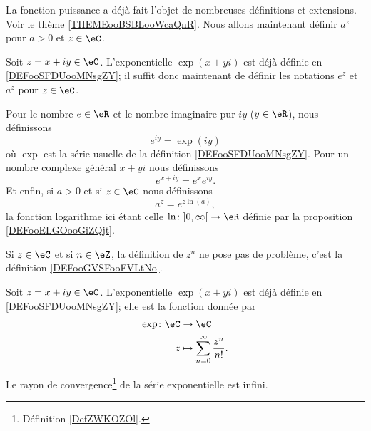 La fonction puissance a déjà fait l'objet de nombreuses définitions et extensions. Voir le thème \ref{THEMEooBSBLooWcaQnR}. Nous allons maintenant définir \( a^z\) pour \( a>0\) et \( z\in \eC\).


Soit \( z=x+iy\in \eC\). L'exponentielle \( \exp(x+yi)\) est déjà définie en \ref{DEFooSFDUooMNsgZY}; il suffit donc maintenant de définir les notations \(  e^{z}\) et \( a^z\) pour \( z\in \eC\).

\begin{definition}      \label{DEFooRBTDooNLcWGj}
	Pour le nombre \( e\in \eR\) et le nombre imaginaire pur \( iy\) (\( y\in \eR\)), nous définissons
	\begin{equation}
		e^{iy}=\exp(iy)
	\end{equation}
	où \( \exp\) est la série usuelle de la définition \ref{DEFooSFDUooMNsgZY}. Pour un nombre complexe général \( x+yi\) nous définissons
	\begin{equation}
		e^{x+iy}= e^{x} e^{iy}.
	\end{equation}
	Et enfin, si \( a>0\) et si \( z\in \eC\) nous définissons
	\begin{equation}
		a^z= e^{z\ln(a)},
	\end{equation}
	la fonction logarithme ici étant celle \( \ln\colon \mathopen] 0 , \infty \mathclose[\to \eR\) définie par la proposition \ref{DEFooELGOooGiZQjt}.
\end{definition}

Si \( z\in \eC\) et si \( n\in \eZ\), la définition de \( z^n\) ne pose pas de problème, c'est la définition \ref{DEFooGVSFooFVLtNo}.

\begin{normaltext}  \label{DefJilXoM}
	Soit \( z=x+iy\in \eC\). L'exponentielle \( \exp(x+yi)\) est déjà définie en \ref{DEFooSFDUooMNsgZY}; elle est la fonction donnée par
	\begin{equation}
		\begin{aligned}
			\exp\colon \eC & \to \eC                                        \\
			z              & \mapsto \sum_{n=0}^{\infty}\frac{ z^n }{ n! }.
		\end{aligned}
	\end{equation}
\end{normaltext}

\begin{proposition}     \label{PROPooXEYFooIEaPvU}
	Le rayon de convergence\footnote{Définition \ref{DefZWKOZOl}.} de la série exponentielle est infini.
\end{proposition}

